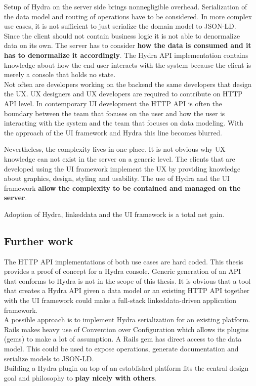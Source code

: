 Setup of Hydra on the server side brings nonnegligible overhead. Serialization of the data model and routing of operations have to be considered. In more complex use cases, it is not sufficient to just serialize the domain model to JSON-LD. Since the client should not contain business logic it is not able to denormalize data on its own. The server has to consider \textbf{how the data is consumed and it has to denormalize it accordingly}. The Hydra API implementation contains knowledge about how the end user interacts with the system because the client is merely a console that holds no state. \\
Not often are developers working on the backend the same developers that design the UX. UX designers and UX developers are required to contribute on HTTP API level. In contemporary UI development the HTTP API is often the boundary between the team that focuses on the user and how the user is interacting with the system and the team that focuses on data modeling. With the approach of the UI framework and Hydra this line becomes blurred.

Nevertheless, the complexity lives in one place. It is not obvious why UX knowledge can not exist in the server on a generic level. The clients that are developed using the UI framework implement the UX by providing knowledge about graphics, design, styling and usability. The use of Hydra and the UI framework \textbf{allow the complexity to be contained and managed on the server}.

Adoption of Hydra, \gls{linkeddata} and the UI framework is a total net gain.

\subsection{Further work}
The HTTP API implementations of both use cases are hard coded. This thesis provides a proof of concept for a Hydra console. Generic generation of an API that conforms to Hydra is not in the scope of this thesis. It is obvious that a tool that creates a Hydra API given a data model or an existing HTTP API together with the UI framework could make a full-stack \gls{linkeddata}-driven application framework. \\
A possible approach is to implement Hydra serialization for an existing platform. Rails makes heavy use of Convention over Configuration which allows its plugins (gems) to make a lot of assumption. A Rails gem has direct access to the data model. This could be used to expose operations, generate documentation and serialize models to JSON-LD. \\
Building a Hydra plugin on top of an established platform fits the central design goal and philosophy to \textbf{play nicely with others}.
